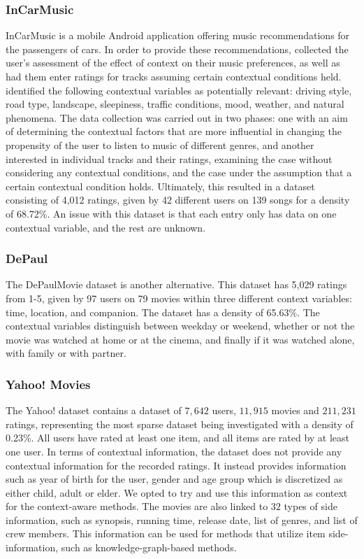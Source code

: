 \subsubsection{InCarMusic}
InCarMusic\cite{InCarMusic2011} is a mobile Android application offering music recommendations for the passengers of cars.
In order to provide these recommendations, \cite{InCarMusic2011} collected the user's assessment of the effect of context on their music preferences, as well as had them enter ratings for tracks assuming certain contextual conditions held.
\cite{InCarMusic2011} identified the following contextual variables as potentially relevant: driving style, road type, landscape, sleepiness, traffic conditions, mood, weather, and natural phenomena.
The data collection was carried out in two phases: one with an aim of determining the contextual factors that are more influential in changing the propensity of the user to listen to music of different genres, and another interested in individual tracks and their ratings, examining the case without considering any contextual conditions, and the case under the assumption that a certain contextual condition holds.
Ultimately, this resulted in a dataset consisting of 4,012 ratings, given by 42 different users on 139 songs for a density of 68.72\%.
An issue with this dataset is that each entry only has data on one contextual variable, and the rest are unknown.

\subsubsection{DePaul}
The DePaulMovie\cite{DePaulData} dataset is another alternative.
This dataset has 5,029 ratings from 1-5, given by 97 users on 79 movies within three different context variables: time, location, and companion\cite{DePaulData}.
The dataset has a density of 65.63\%.
The contextual variables distinguish between weekday or weekend, whether or not the movie was watched at home or at the cinema, and finally if it was watched alone, with family or with partner.

\subsubsection{Yahoo! Movies}
The Yahoo! dataset\cite{yahoo-movie} contains a dataset of $7,642$ users, $11,915$ movies and $211,231$ ratings, representing the most sparse dataset being investigated with a density of 0.23\%.
All users have rated at least one item, and all items are rated by at least one user.
In terms of contextual information, the dataset does not provide any contextual information for the recorded ratings.
It instead provides information such as year of birth for the user, gender and age group which is discretized as either child, adult or elder.
We opted to try and use this information as context for the context-aware methods.
The movies are also linked to $32$ types of side information, such as synopsis, running time, release date, list of genres, and list of crew members.
This information can be used for methods that utilize item side-information, such as knowledge-graph-based methods.

